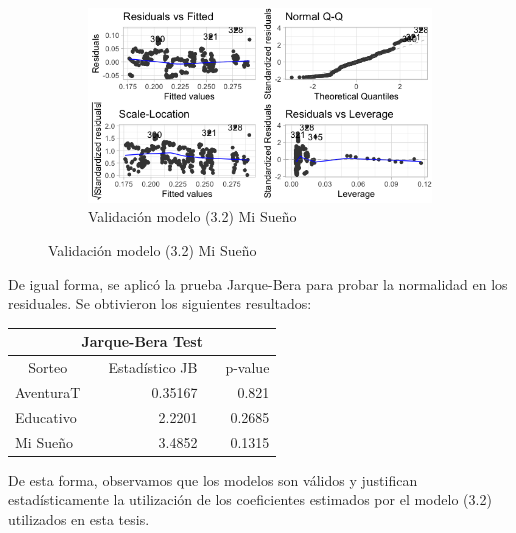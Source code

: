 \begin{figure}[H]
\centering
\label{fig:Validacion_modelo2}
\begin{subfigure}
  \centering
  \caption{Validación modelo (3.2) Mi Sueño}
  \includegraphics[width=.85\linewidth]{Imagenes/cuadratico_suen.png}
\end{subfigure}%
\end{figure}

De igual forma, se aplicó la prueba Jarque-Bera para probar la normalidad en los residuales. Se obtivieron los siguientes resultados:


\begin{table}[H]
\centering
\begin{tabular}{@{}lrrlr@{}}
\toprule
\multicolumn{5}{c}{Jarque-Bera Test}                                                                \\ \midrule
\multicolumn{1}{c}{Sorteo} & \multicolumn{1}{c}{} & \multicolumn{1}{c}{Estadístico JB} &  & p-value \\ \midrule
AventuraT                  &                      & 0.35167                            &  & 0.821  \\
Educativo                  &                      & 2.2201                             &  & 0.2685   \\
Mi Sueño                   &                      & 3.4852                             &  & 0.1315   \\ \bottomrule
\end{tabular}
\end{table}


De esta forma, observamos que los modelos son válidos y justifican estadísticamente la utilización de los coeficientes estimados por el modelo (3.2) utilizados en esta tesis.